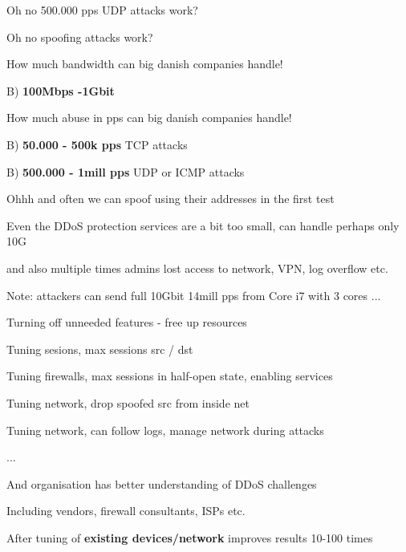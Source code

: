 \documentclass[20pt,landscape,a4paper,footrule]{foils}
\begin{document}
\centerline{Oh no 500.000 pps UDP attacks work?}


\centerline{Oh no spoofing attacks work?}





How much bandwidth can big danish companies handle!
\begin{list2}
\item B) {\bf 100Mbps -1Gbit}
\end{list2}

How much abuse in pps can big danish companies handle!
\begin{list2}
\item B) {\bf 50.000 - 500k pps} TCP attacks
\item B) {\bf 500.000 - 1mill pps} UDP or ICMP attacks
\item Ohhh and often we can spoof using their addresses in the first test
\end{list2}

Even the DDoS protection services are a bit too small, can handle perhaps only 10G

and also multiple times admins lost access to network, VPN, log overflow etc.

\vskip 2cm
Note: attackers can send full 10Gbit 14mill pps from Core i7 with 3 cores ...


\begin{list1}
\item Turning off unneeded features - free up resources
\item Tuning sesions, max sessions src / dst
\item Tuning firewalls, max sessions in half-open state, enabling services
\item Tuning network, drop spoofed src from inside net \smiley
\item Tuning network, can follow logs, manage network during attacks
\item ...
\item And organisation has better understanding of DDoS challenges
\item Including vendors, firewall consultants, ISPs etc.
\end{list1}

\vskip 1cm
\centerline{After tuning of {\bf existing devices/network} improves results 10-100 times}
\end{document}
